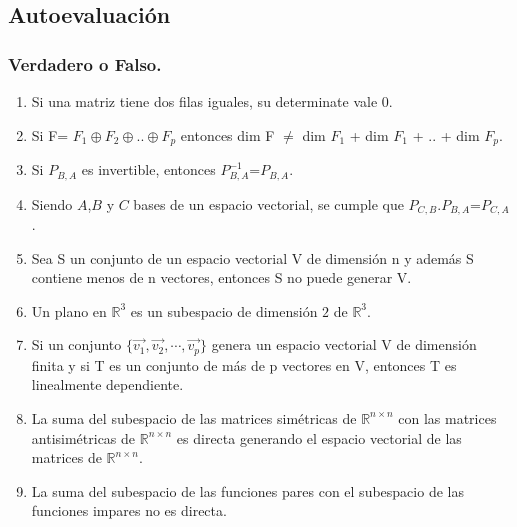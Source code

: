 
\bigskip

 \subsection{Autoevaluación}
 \label{Auto1}
 

\subsubsection{Verdadero o Falso.}


 \bigskip

\begin{enumerate}

\item

Si una matriz tiene dos filas iguales, su determinate vale $0$.

\item

Si F= $F_1 \oplus F_2 \oplus .. \oplus F_p$ entonces dim F $ \neq $ dim $F_1$ + dim $F_1$ + .. + dim $F_p$.

\item

Si $P_{B,A}$ es invertible, entonces $P^{-1}_{B,A}$=$P_{B,A}$.

\item

Siendo $A$,$ B$ y $C$  bases de un espacio vectorial,  se cumple que $P_{C,B}.P_{B,A}$=$P_{C,A}$. 

\item

 Sea S un conjunto de un espacio vectorial V de dimensión n y además S contiene menos de n vectores, entonces S no puede generar V.

\item

Un plano en $\mathbb{R}^3$ es un subespacio de dimensión $2$ de $\mathbb{R}^3$.


\item

Si un conjunto $\{\vec{v_1},\vec{v_2},\cdots,\vec{v_p}\}$ genera un espacio vectorial V de dimensión finita y si T es un conjunto de más de p vectores en V, entonces T es linealmente dependiente.

\item

La suma del subespacio de  las matrices simétricas de $\mathbb{R}^{n \times n}$  con las matrices antisimétricas de $\mathbb{R}^{n \times n}$ es directa generando el espacio vectorial de las matrices de $\mathbb{R}^{n \times n}$.

\item

La suma del subespacio de las  funciones pares con el subespacio de las funciones impares no es directa.

\end{enumerate}


